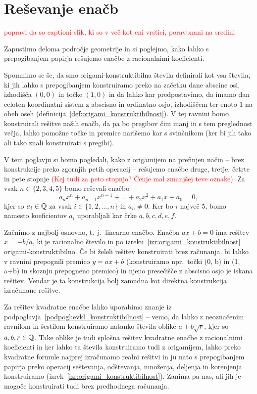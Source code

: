 \section{Reševanje enačb}
\label{pogl:enacbe}


\textcolor{red}{popravi da so captioni slik, ki so v več kot eni vrstici, poravbnani na sredini}


Zapustimo deloma področje geometrije in si poglejmo, kako lahko s prepogibanjem papirja rešujemo enačbe z racionalnimi koeficienti.

Spomnimo se še, da smo origami-konstruktibilna števila definirali kot vsa števila, ki jih lahko s prepogibanjem konstruiramo preko na začetku dane abscine osi, izhodišča $(0,0)$ in točke $(1,0)$ in da lahko kar predpostavimo, da imamo dan celoten koordinatni sistem z abscisno in ordinatno osjo, izhodiščem ter enoto $1$ na obeh oseh (definicija~\ref{def:origami_konstruktibilnost}). V tej ravnini bomo konstruirali rešitve naših enačb, da pa bo pregibov čim manj in s tem preglednost večja, lahko pomožne točke in premice narišemo kar s svinčnikom (ker bi jih tako ali tako znali konstruirati s pregibi).

V tem poglavju si bomo pogledali, kako z origamijem na prefinjen način -- brez konstrukcije preko zgornjih petih operacij -- rešujemo enačbe druge, tretje, četrte in pete stopnje \textcolor{red}{(Kej tudi za peto stopnjo? Čenje mal zmanjšej teve oznake)}. Za vsak $n \in \{2, 3, 4, 5\}$ bomo reševali enačbo
$$ a_n x^n + a_{n-1} x^{n-1} + \ldots + a_2 x^2 + a_1 x + a_0 = 0, $$
kjer so $a_i \in \mathbb Q$ za vsak $i \in \{1, 2, \ldots, n\}$ in $a_n \neq 0$. Ker bo $i$ največ $5$, bomo namesto koeficientov $a_i$ uporabljali kar črke $a, b, c, d, e, f$.

Začnimo z najbolj osnovno, t.\ j.\ linearno enačbo. Enačba $ax + b = 0$ ima rešitev $x = -b/a$, ki je racionalno število in po izreku~\ref{izr:origami_konstruktibilnost} origami-konstruktibilno. Če bi želeli rešitev konstruirati brez računanja. bi lahko v ravnini prepognili premico $y = ax + b$ (konstruiramo npr.\ točki (0, b) in (1, a+b) in skoznju prepogneno premico) in njeno presečišče z abscisno osjo je iskana rešitev. Vendar je ta konstrukcija bolj zamudna kot direktna konstrukcija izračunane rešitve.

Za rešitev kvadratne enačbe lahko uporabimo znanje iz podpoglavja~\ref{podpogl:evkl_konstruktibilnost} -- vemo, da lahko z neoznačenim ravnilom in šestilom konstruiramo natanko števila oblike $a + b\sqrt{r}$, kjer so $a, b, r \in \mathbb Q$. Take oblike je tudi splošna rešitev kvadratne enačbe z racionalnimi koeficienti in ker lahko ta števila konstruiramo tudi z origamijem, lahko preko kvadratne formule najprej izračunamo realni rešitvi in ju nato s prepogibanjem papirja preko operacij seštevanja, odštevanja, množenja, deljenja in korenjenja konstruiramo (izrek~\ref{izr:origami_konstruktibilnost}). Zanima pa nas, ali jih je mogoče konstruirati tudi brez predhodnega računanja.


